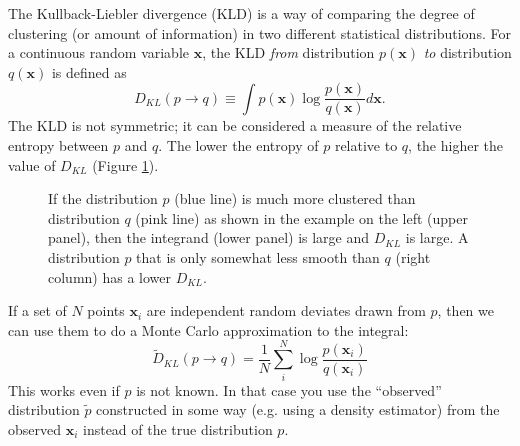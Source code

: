 \documentclass{emulateapj}
\begin{document}
The Kullback-Liebler divergence (KLD) is a way of comparing the degree of clustering (or amount of information) in two different statistical distributions. For a continuous random variable $\mathbf{x}$, the KLD \emph{from} distribution $p(\mathbf{x})$ \emph{to} distribution $q(\mathbf{x})$ is defined as
\begin{equation}
 D_{KL}(p\to q) \equiv \int p(\mathbf{x}) \log \frac{p(\mathbf{x})}{q(\mathbf{x})} d\mathbf{x}.
\end{equation}
The KLD is not symmetric; it can be considered a measure of the relative entropy between $p$ and $q$. The lower the entropy of $p$ relative to $q$, the higher the value of $D_{KL}$ (Figure \ref{fig:1Dexample}).
\begin{figure}
\caption{If the distribution $p$ (blue line) is much more clustered than distribution $q$ (pink line) as shown in the example on the left (upper panel), then the integrand (lower panel) is large and $D_{KL}$ is large. A distribution $p$ that is only somewhat less smooth than $q$ (right column) has a lower $D_{KL}$.}
\label{fig:1Dexample}
\end{figure}

If a set of $N$ points $\mathbf{x}_i$ are independent random deviates drawn from $p$, then we can use them to do a Monte Carlo approximation to the integral:
\begin{equation}
  \tilde{D}_{KL}(p\to q) = \frac{1}{N} \sum_{i}^{N} \log \frac{p(\mathbf{x}_i)}{q(\mathbf{x}_i)}
\end{equation}
This works even if $p$ is not known. In that case you use the ``observed'' distribution $\tilde{p}$ constructed in some way (e.g. using a density estimator) from the observed $\mathbf{x}_i$ instead of the true distribution $p$. 

\end{document}
